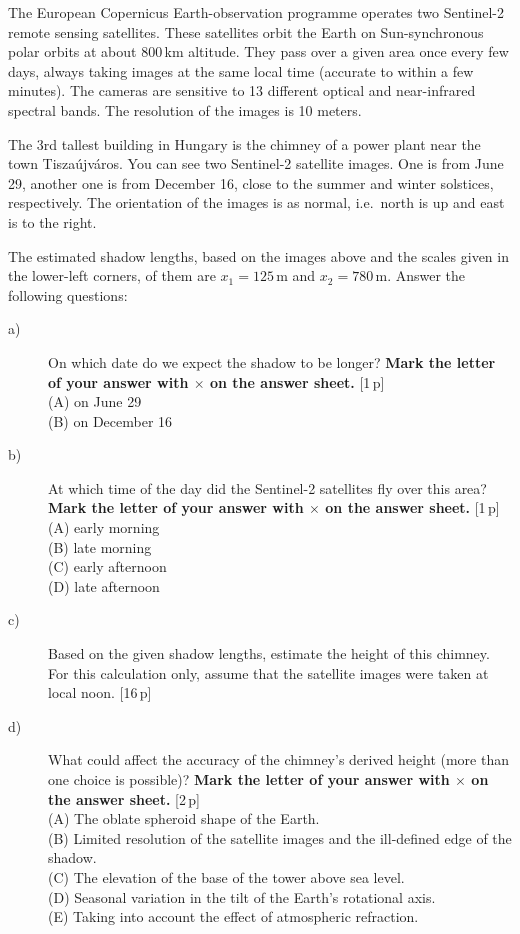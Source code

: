 The European Copernicus Earth-observation programme operates two Sentinel-2
remote sensing satellites. These satellites orbit the Earth on Sun-synchronous
polar orbits at about 800\,km altitude. They pass over a given area once every
few days, always taking images at the same local time (accurate to within a few
minutes). The cameras are sensitive to 13 different optical and near-infrared
spectral bands. The resolution of the images is 10 meters.

The 3rd tallest building in Hungary is the chimney of a power plant near the
town Tisza\'ujv\'aros. You can see two Sentinel-2 satellite images. One is from
June 29, another one is from December 16, close to the summer and winter
solstices, respectively. The orientation of the images is as normal, i.e.\
north is up and east is to the right.


The estimated shadow lengths, based on the images above and the scales given in
the lower-left corners, of them are $x_1 = 125$\,m and $x_2 = 780$\,m. Answer
the following questions:

\begin{description}
\item[a)] On which date do we expect the shadow to be longer? \textbf{Mark the
  letter of your answer with $\times$ on the answer sheet.} \hfill[1\,p]\\
  (A) on June 29\\
  (B) on December 16
\item[b)] At which time of the day did the Sentinel-2 satellites fly over this
  area? \textbf{Mark the letter of your answer with $\times$ on the answer
  sheet.} \hfill[1\,p]\\
  (A) early morning\\
  (B) late morning\\
  (C) early afternoon\\
  (D) late afternoon
\item[c)] Based on the given shadow lengths, estimate the height of this
  chimney. For this calculation only, assume that the satellite images were
  taken at local noon. \hfill[16\,p]
\item[d)] What could affect the accuracy of the chimney's derived height (more
  than one choice is possible)? \textbf{Mark the letter of your answer with
  $\times$ on the answer sheet.} \hfill[2\,p]\\
  (A) The oblate spheroid shape of the Earth.\\
  (B) Limited resolution of the satellite images and the ill-defined edge of
  the shadow.\\
  (C) The elevation of the base of the tower above sea level.\\
  (D) Seasonal variation in the tilt of the Earth's rotational axis.\\
  (E) Taking into account the effect of atmospheric refraction.
\end{description}
